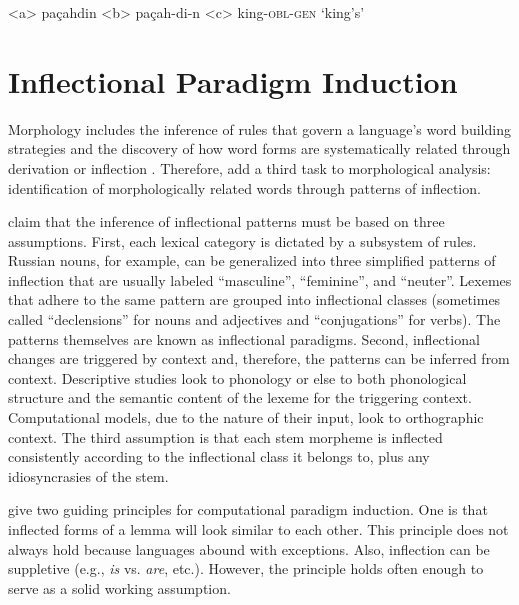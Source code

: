 \begin{singlespace}

\label{ex:Lezgi1}
\a<a> pa\c{c}ahdin
\label{ex:Lezgi1a}
\a<b> pa\c{c}ah-di-n
\label{ex:Lezgi1b}
\a<c> king-\textsc{obl}-\textsc{gen}
\label{ex:Lezgi1c}
\a `king's'
\label{ex:Lezgi1d}
\xe

\end{singlespace}


\section{Inflectional Paradigm Induction}

Morphology includes the inference of rules that govern a language’s word building strategies and the discovery of how word forms are systematically related through derivation or inflection \citep{roark_computational_2007}. Therefore, \citet{virpioja_empirical_2011} add a third task to morphological analysis: identification of morphologically related words through patterns of inflection.

\citet{durrett-denero-2013-supervised} claim that the inference of inflectional patterns must be based on three assumptions. First, each lexical category is dictated by a subsystem of rules. Russian nouns, for example, can be generalized into three simplified patterns of inflection that are usually labeled ``masculine'', ``feminine'', and ``neuter''. Lexemes that adhere to the same pattern are grouped into inflectional classes (sometimes called ``declensions'' for nouns and adjectives and ``conjugations'' for verbs). The patterns themselves are known as inflectional paradigms. Second, inflectional changes are triggered by context and, therefore, the patterns can be inferred from context. Descriptive studies look to phonology or else to both phonological structure and the semantic content of the lexeme for the triggering context. Computational models, due to the nature of their input, look to orthographic context. The third assumption is that each stem morpheme is inflected consistently according to the inflectional class it belongs to, plus any idiosyncrasies of the stem.

\citet{monson_paramorfinding_2007b} give two guiding principles for computational paradigm induction. One is that inflected forms of a lemma will look similar to each other. This principle does not always hold because languages abound with exceptions. Also, inflection can be suppletive (e.g., \textit{is} vs. \textit{are}, etc.). However, the principle holds often enough to serve as a solid working assumption.  

